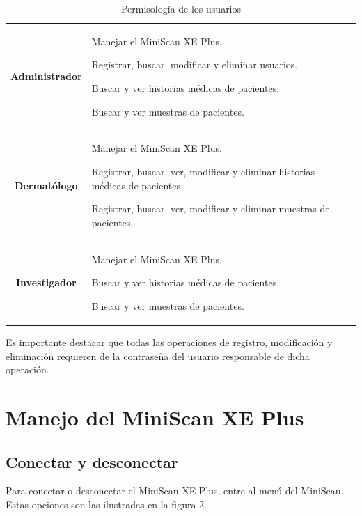 \begin{table}[h]
		\small
		\caption[Permisolog\'{i}a de los usuarios]{Permisolog\'{i}a de los usuarios}
		\centering
		\setlength{\extrarowheight}{\altocelda}
		\begin{tabulary}{\anchotabla}{|c|J|}
			\hline
			 & \\ \hline
			
			\textbf{Administrador} &
			
			Manejar el MiniScan XE Plus.
			
			Registrar, buscar, modificar y eliminar usuarios.
			
			Buscar y ver historias m\'{e}dicas de pacientes.
			
			Buscar y ver muestras de pacientes.\\ \hline
			
			\textbf{Dermat\'{o}logo} &
			
			Manejar el MiniScan XE Plus.
			
			Registrar, buscar, ver, modificar y eliminar historias m\'{e}dicas de pacientes.
			
			Registrar, buscar, ver, modificar y eliminar muestras de pacientes.\\ \hline
			
			\textbf{Investigador} &
			
			Manejar el MiniScan XE Plus.
			
			Buscar y ver historias m\'{e}dicas de pacientes.
			
			Buscar y ver muestras de pacientes.\\ \hline
		\end{tabulary}
	\end{table}

	Es importante destacar que todas las operaciones de registro, modificaci\'{o}n y eliminaci\'{o}n requieren de la contrase\~{n}a del usuario responsable de dicha operaci\'{o}n.
	
\newpage

\section{Manejo del MiniScan XE Plus}

	\subsection{Conectar y desconectar}
		Para conectar o desconectar el MiniScan XE Plus, entre al men\'{u} del MiniScan. Estas opciones son las ilustradas en la figura 2.

